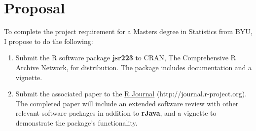 
\chapter{Proposal}

To complete the project requirement for a Masters degree in Statistics from BYU, I propose to do the following:

\begin{enumerate}
\item Submit the R software package \textbf{jsr223} to CRAN, The Comprehensive R Archive Network, for distribution. The package includes documentation and a vignette.

\item Submit the associated paper to the \href{http://journal.r-project.org}{R Journal} (http://journal.r-project.org). The completed paper will include an extended software review with other relevant software packages in addition to \textbf{rJava}, and a vignette to demonstrate the package's functionality.
\end{enumerate}